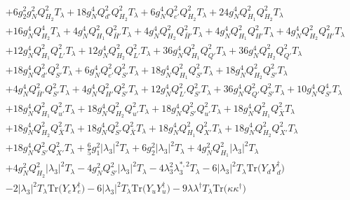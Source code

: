{\begin{align}
 &+6 g_{2}^{2} g_{N}^{2} Q_{H_2}^{2} T_{\lambda} +18 g_{N}^{4} Q_{d'}^{2} Q_{H_2}^{2} T_{\lambda} +6 g_{N}^{4} Q_{e'}^{2} Q_{H_2}^{2} T_{\lambda} +24 g_{N}^{4} Q_{H_1}^{2} Q_{H_2}^{2} T_{\lambda} \nonumber \\ 
 &+16 g_{N}^{4} Q_{H_2}^{4} T_{\lambda} +4 g_{N}^{4} Q_{H_1}^{2} Q_{\bar{H}'}^{2} T_{\lambda} +4 g_{N}^{4} Q_{H_2}^{2} Q_{\bar{H}'}^{2} T_{\lambda} +4 g_{N}^{4} Q_{H_1}^{2} Q_{H'}^{2} T_{\lambda} +4 g_{N}^{4} Q_{H_2}^{2} Q_{H'}^{2} T_{\lambda} \nonumber \\ 
 &+12 g_{N}^{4} Q_{H_1}^{2} Q_{L'}^{2} T_{\lambda} +12 g_{N}^{4} Q_{H_2}^{2} Q_{L'}^{2} T_{\lambda} +36 g_{N}^{4} Q_{H_1}^{2} Q_{Q'}^{2} T_{\lambda} +36 g_{N}^{4} Q_{H_2}^{2} Q_{Q'}^{2} T_{\lambda} \nonumber \\ 
 &+18 g_{N}^{4} Q_{d'}^{2} Q_{S'}^{2} T_{\lambda} +6 g_{N}^{4} Q_{e'}^{2} Q_{S'}^{2} T_{\lambda} +18 g_{N}^{4} Q_{H_1}^{2} Q_{S'}^{2} T_{\lambda} +18 g_{N}^{4} Q_{H_2}^{2} Q_{S'}^{2} T_{\lambda} \nonumber \\ 
 &+4 g_{N}^{4} Q_{\bar{H}'}^{2} Q_{S'}^{2} T_{\lambda} +4 g_{N}^{4} Q_{H'}^{2} Q_{S'}^{2} T_{\lambda} +12 g_{N}^{4} Q_{L'}^{2} Q_{S'}^{2} T_{\lambda} +36 g_{N}^{4} Q_{Q'}^{2} Q_{S'}^{2} T_{\lambda} +10 g_{N}^{4} Q_{S'}^{4} T_{\lambda} \nonumber \\ 
 &+18 g_{N}^{4} Q_{H_1}^{2} Q_{u'}^{2} T_{\lambda} +18 g_{N}^{4} Q_{H_2}^{2} Q_{u'}^{2} T_{\lambda} +18 g_{N}^{4} Q_{S'}^{2} Q_{u'}^{2} T_{\lambda} +18 g_{N}^{4} Q_{H_1}^{2} Q_{\bar{X}}^{2} T_{\lambda} \nonumber \\ 
 &+18 g_{N}^{4} Q_{H_2}^{2} Q_{\bar{X}}^{2} T_{\lambda} +18 g_{N}^{4} Q_{S'}^{2} Q_{\bar{X}}^{2} T_{\lambda} +18 g_{N}^{4} Q_{H_1}^{2} Q_{X'}^{2} T_{\lambda} +18 g_{N}^{4} Q_{H_2}^{2} Q_{X'}^{2} T_{\lambda} \nonumber \\ 
 &+18 g_{N}^{4} Q_{S'}^{2} Q_{X'}^{2} T_{\lambda} +\frac{6}{5} g_{1}^{2} |\lambda_3|^2 T_{\lambda} +6 g_{2}^{2} |\lambda_3|^2 T_{\lambda} +4 g_{N}^{2} Q_{H_1}^{2} |\lambda_3|^2 T_{\lambda} \nonumber \\ 
 &+4 g_{N}^{2} Q_{H_2}^{2} |\lambda_3|^2 T_{\lambda} -4 g_{N}^{2} Q_{S'}^{2} |\lambda_3|^2 T_{\lambda} -4 \lambda_{3}^{2} \lambda_{3}^{*,2} T_{\lambda} -6 |\lambda_3|^2 T_{\lambda} \mbox{Tr}\Big({Y_d  Y_{d}^{\dagger}}\Big) \nonumber \\ 
 &-2 |\lambda_3|^2 T_{\lambda} \mbox{Tr}\Big({Y_e  Y_{e}^{\dagger}}\Big) -6 |\lambda_3|^2 T_{\lambda} \mbox{Tr}\Big({Y_u  Y_{u}^{\dagger}}\Big) -9 {\lambda  \lambda^{\dagger}  T_{\lambda}} \mbox{Tr}\Big({\kappa  \kappa^{\dagger}}\Big) \nonumber \\ 

\end{align}}
